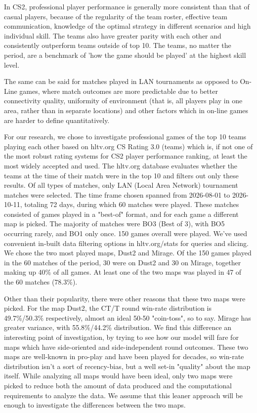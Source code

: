 \documentclass[twoside,11pt]{article}
\begin{document}
In CS2, professional player performance is generally more consistent than that of casual players,
because of the regularity of the team roster, effective team communication, knowledge of the optimal
strategy in different scenarios and high individual skill. The teams also have greater parity with
each other and consistently outperform teams outside of top 10. The teams, no matter the period, are
a benchmark of 'how the game should be played' at the highest skill level.

The same can be said for matches played in LAN tournaments as opposed to On-Line games, where match
outcomes are more predictable due to better connectivity quality, uniformity of environment (that
is, all players play in one area, rather than in separate locations) and other factors which in
on-line games are harder to define quantitatively.

For our research, we chose to investigate professional games of the top 10 teams playing each other
based on hltv.org CS Rating 3.0 (teams) which is, if not one of the most robust rating systems for
CS2 player performance ranking, at least the most widely accepted and used. The hltv.org database
evaluates whether the teams at the time of their match were in the top 10 and filters out only these
results. Of all types of matches, only LAN (Local Area Network) tournament matches were selected.
The time frame chosen spanned from 2026-08-01 to 2026-10-11, totaling 72 days, during which 60
matches were played. These matches consisted of games played in a "best-of" format, and for each
game a different map is picked. The majority of matches were BO3 (Best of 3), with BO5 occurring
rarely, and BO1 only once. 150 games overall were played. We've used convenient in-built data
filtering options in hltv.org/stats for queries and slicing. We chose the two most played maps,
Dust2 and Mirage. Of the 150 games played in the 60 matches of the period, 30 were on Dust2 and 30
on Mirage, together making up 40\% of all games. At least one of the two maps was played in 47 of
the 60 matches (78.3\%).

Other than their popularity, there were other reasons that these two maps were picked. For the map
Dust2, the CT/T round win-rate distribution is 49.7\%/50.3\% respectively, almost an ideal 50-50
"coin-toss", so to say. Mirage has greater variance, with 55.8\%/44.2\% distribution. We find this
difference an interesting point of investigation, by trying to see how our model will fare for maps
which have side-oriented and side-independent round outcomes. These two maps are well-known in
pro-play and have been played for decades, so win-rate distribution isn't a sort of recency-bias,
but a well set-in "quality" about the map itself. While analyzing all maps would have been ideal,
only two maps were picked to reduce both the amount of data produced and the computational
requirements to analyze the data. We assume that this leaner approach will be enough to investigate
the differences between the two maps.
\end{document}
